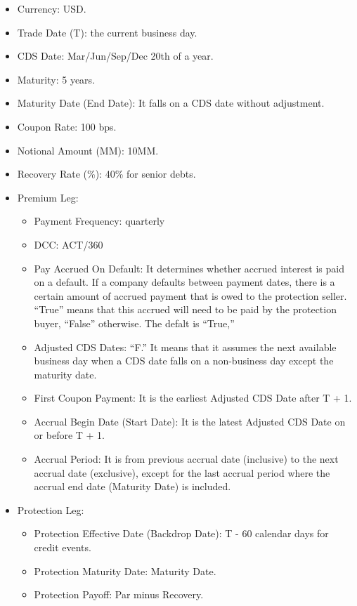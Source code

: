 \documentclass[a4paper]{article}
\begin{document}
\begin{itemize}
\item Currency: USD.
\item Trade Date (T): the current business day.
\item CDS Date: Mar/Jun/Sep/Dec 20th of a year.
\item Maturity: 5 years.
\item Maturity Date (End Date): It falls on a CDS date without
  adjustment.
\item Coupon Rate: 100 bps.
\item Notional Amount (MM): 10MM.
\item Recovery Rate (\%): 40\% for senior debts.
\item Premium Leg:
  \begin{itemize}
    \item Payment Frequency: quarterly
    \item DCC: ACT/360
    \item Pay Accrued On Default: It determines whether accrued
      interest is paid on a default. If a company defaults between
      payment dates, there is a certain amount of accrued payment that
      is owed to the protection seller. ``True'' means that this
      accrued will need to be paid by the protection buyer, ``False''
      otherwise. The defalt is ``True,''
    \item Adjusted CDS Dates: ``F.'' It means that it assumes the next
      available business day when a CDS date falls on a non-business day
      except the maturity date.
    \item First Coupon Payment: It is the earliest Adjusted CDS Date
      after T + 1.
    \item Accrual Begin Date (Start Date): It is the latest Adjusted
      CDS Date on or before T + 1.
    \item Accrual Period: It is from previous accrual date (inclusive)
      to the next accrual date (exclusive), except for the last
      accrual period where the accrual end date (Maturity Date) is
      included.
  \end{itemize}
\item Protection Leg:
  \begin{itemize}
  \item Protection Effective Date (Backdrop Date): T - 60 calendar
    days for credit events.
  \item Protection Maturity Date: Maturity Date.
  \item Protection Payoff: Par minus Recovery.
  \end{itemize}
\end{itemize}
\end{document}

